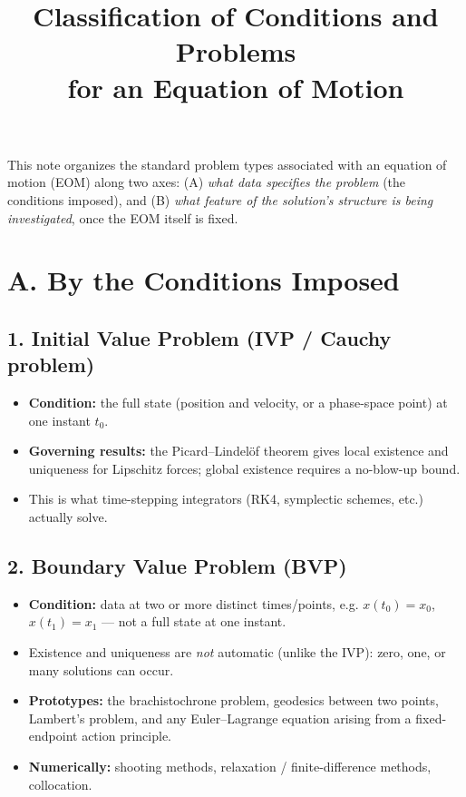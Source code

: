 \documentclass[11pt]{article}
\title{Classification of Conditions and Problems\\ for an Equation of Motion}
\author{}
\date{}
\begin{document}
\maketitle

This note organizes the standard problem types associated with an
equation of motion (EOM) along two axes: (A) \emph{what data specifies
the problem} (the conditions imposed), and (B) \emph{what feature of
the solution's structure is being investigated}, once the EOM itself
is fixed.

\section*{A. By the Conditions Imposed}

\subsection*{1. Initial Value Problem (IVP / Cauchy problem)}
\begin{itemize}[leftmargin=*]
  \item \textbf{Condition:} the full state (position and velocity, or a
  phase-space point) at one instant $t_0$.
  \item \textbf{Governing results:} the Picard--Lindel\"of theorem gives
  local existence and uniqueness for Lipschitz forces; global existence
  requires a no-blow-up bound.
  \item This is what time-stepping integrators (RK4, symplectic
  schemes, etc.) actually solve.
\end{itemize}

\subsection*{2. Boundary Value Problem (BVP)}
\begin{itemize}[leftmargin=*]
  \item \textbf{Condition:} data at two or more distinct times/points,
  e.g. $x(t_0) = x_0$, $x(t_1) = x_1$ --- not a full state at one
  instant.
  \item Existence and uniqueness are \emph{not} automatic (unlike the
  IVP): zero, one, or many solutions can occur.
  \item \textbf{Prototypes:} the brachistochrone problem, geodesics
  between two points, Lambert's problem, and any Euler--Lagrange
  equation arising from a fixed-endpoint action principle.
  \item \textbf{Numerically:} shooting methods, relaxation /
  finite-difference methods, collocation.
\end{itemize}
\end{document}

